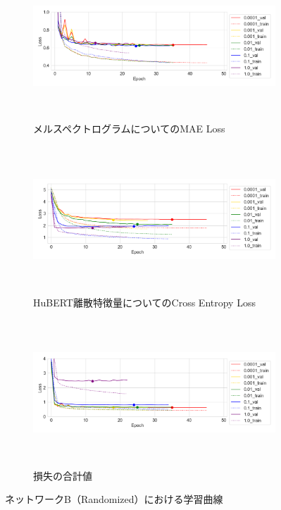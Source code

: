 \begin{figure}[bt]
    \centering
    \begin{subfigure}{\linewidth}
        \centering
        \includegraphics[height=55mm]{./figure/sec4/learning_curves/2/mel_loss.png}
        \caption{メルスペクトログラムについてのMAE Loss}
        \label{sec4:fig:learning_curve_method_2_val_mel_loss}
    \end{subfigure}
    \begin{subfigure}{\linewidth}
        \centering
        \includegraphics[height=55mm]{./figure/sec4/learning_curves/2/ssl_feature_cluster_loss.png}
        \caption{HuBERT離散特徴量についてのCross Entropy Loss}
        \label{sec4:fig:learning_curve_method_2_val_ssl_feature_cluster_loss}
    \end{subfigure}
    \begin{subfigure}{\linewidth}
        \centering
        \includegraphics[height=55mm]{./figure/sec4/learning_curves/2/total_loss.png}
        \caption{損失の合計値}
        \label{sec4:fig:learning_curve_method_2_val_total_loss}
    \end{subfigure}
    \caption{ネットワークB（Randomized）における学習曲線}
    \label{sec4:fig:learning_curve_method_2_val_losses}
\end{figure}

